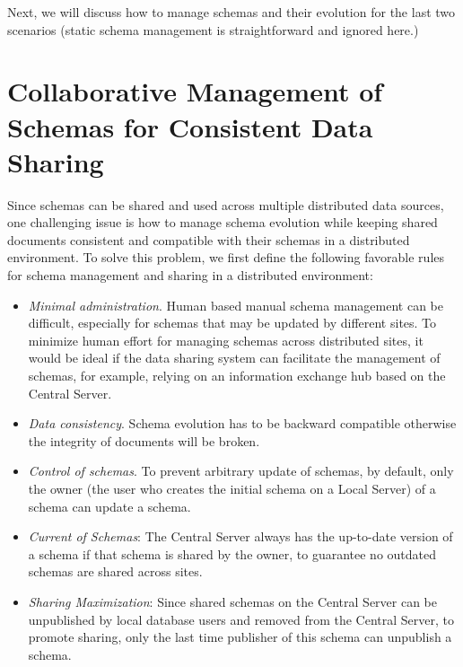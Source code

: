 \documentclass{doublecol-new}
\theoremstyle{TH}{
\newtheorem{lemma}{Lemma}
\newtheorem{theorem}[lemma]{Theorem}
\newtheorem{corrolary}[lemma]{Corrolary}
\newtheorem{conjecture}[lemma]{Conjecture}
\newtheorem{proposition}[lemma]{Proposition}
\newtheorem{claim}[lemma]{Claim}
\newtheorem{stheorem}[lemma]{Wrong Theorem}
\newtheorem{algorithm}{Algorithm}
}
\theoremstyle{THrm}{
\newtheorem{definition}{Definition}[section]
\newtheorem{question}{Question}[section]
\newtheorem{remark}{Remark}
\newtheorem{scheme}{Scheme}
}
\theoremstyle{THhit}{
\newtheorem{case}{Case}[section]
}
\begin{document}


Next, we will discuss how to manage schemas and their evolution for the last
two scenarios (static schema management is straightforward and ignored here.)





\section{Collaborative Management of Schemas for Consistent Data Sharing}
\label{sec:collaborativeschema}

Since schemas can be shared and used across multiple distributed
data sources, one challenging issue is how to manage schema
evolution while keeping shared documents consistent and compatible
with their schemas in a distributed environment. To solve this
problem, we first define the following favorable rules for schema
management and sharing in a distributed environment:
\begin{itemize}

\item {\em Minimal administration}. Human based manual schema
management can be difficult, especially for schemas that may be
updated by different sites.  To minimize human effort for managing
schemas across distributed sites, it would be ideal if the data
sharing system can facilitate the management of schemas, for
example, relying on an information exchange hub  based on the
Central Server.

\item {\em Data consistency}.  Schema evolution has to be backward compatible otherwise the integrity of documents will be broken.

\item {\em Control of schemas}. To prevent arbitrary update of
schemas, by default, only the owner (the user who creates the
initial schema on a Local Server) of a schema can update a schema.

\item {\em Current of Schemas}: The Central Server always has the
up-to-date version of a schema if that schema is shared by the
owner, to guarantee no outdated schemas are shared across sites.

\item {\em Sharing Maximization}: Since shared schemas on the Central
Server can be unpublished by local database users and removed from
the Central Server, to promote sharing, only the last time publisher
of this schema can unpublish a schema.

\end{itemize}
\end{document}
